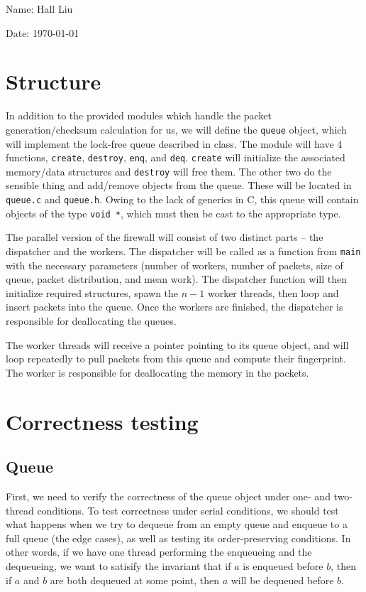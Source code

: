 \documentclass{article}
\begin{document}
Name: Hall Liu

Date: \today 
\vspace{1.5cm}

\section*{Structure}
In addition to the provided modules which handle the packet generation/checksum calculation for us, we will define the \verb|queue| object, which will implement the lock-free queue described in class. The module will have 4 functions, \verb|create|, \verb|destroy|, \verb|enq|, and \verb|deq|. \verb|create| will initialize the associated memory/data structures and \verb|destroy| will free them. The other two do the sensible thing and add/remove objects from the queue. These will be located in \verb|queue.c| and \verb|queue.h|. Owing to the lack of generics in C, this queue will contain objects of the type \verb|void *|, which must then be cast to the appropriate type. 

The parallel version of the firewall will consist of two distinct parts -- the dispatcher and the workers. The dispatcher will be called as a function from \verb|main| with the necessary parameters (number of workers, number of packets, size of queue, packet distribution, and mean work).  The dispatcher function will then initialize required structures, spawn the $n-1$ worker threads, then loop and insert packets into the queue. Once the workers are finished, the dispatcher is responsible for deallocating the queues.

The worker threads will receive a pointer pointing to its queue object, and will loop repeatedly to pull packets from this queue and compute their fingerprint. The worker is responsible for deallocating the memory in the packets. 
\section*{Correctness testing}
\subsection*{Queue}
First, we need to verify the correctness of the queue object under one- and two-thread conditions. To test correctness under serial conditions, we should test what happens when we try to dequeue from an empty queue and enqueue to a full queue (the edge cases), as well as testing its order-preserving conditions. In other words, if we have one thread performing the enqueueing and the dequeueing, we want to satisify the invariant that if $a$ is enqueued before $b$, then if $a$ and $b$ are both dequeued at some point, then $a$ will be dequeued before $b$.
\end{document}
